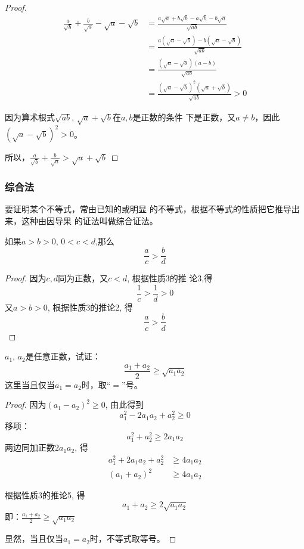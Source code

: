 \begin{proof}
\[\begin{split}
     \frac{a}{\sqrt{b}}+\frac{b}{\sqrt{a}}-\sqrt{a}-\sqrt{b}
    &=\frac{a\sqrt{a}+b\sqrt{b}-a\sqrt{b}-b\sqrt{a}}{\sqrt{ab}}\\
    &=\frac{a\left(\sqrt{a}-\sqrt{b}\right)-b\left(\sqrt{a}-\sqrt{b}\right)}{\sqrt{ab}}\\
    &=\frac{\left(\sqrt{a}-\sqrt{b}\right)(a-b)}{\sqrt{ab}}\\
    &=\frac{\left(\sqrt{a}-\sqrt{b}\right)^2\left(\sqrt{a}+\sqrt{b}\right)}{\sqrt{ab}}>0
\end{split}\]

因为算术根式$\sqrt{ab}$, $\sqrt{a}+\sqrt{b}$在$a,b$是正数的条件
下是正数，又$a\ne b$，因此$\left(\sqrt{a}-\sqrt{b}\right)^2>0$。

所以，$\frac{a}{\sqrt{b}}+\frac{b}{\sqrt{a}}>\sqrt{a}+\sqrt{b}$
\end{proof}

\subsubsection{综合法}
要证明某个不等式，常由已知的或明显
的不等式，根据不等式的性质把它推导出来，这种由因导果
的证法叫做综合证法。
\begin{example}
    如果$a>b>0$, $0<c<d$,那么
    \begin{equation}
        \frac{a}{c}>\frac{b}{d}
    \end{equation}
\end{example}

\begin{proof}
 因为$c,d$同为正数，又$c<d$, 根据性质3的推
论3,得\[\frac{1}{c}>\frac{1}{d}>0\]
又$a>b>0$,
根据性质3的推论2, 得   
\[\frac{a}{c}>\frac{b}{d}\]
\end{proof}
    
\begin{example}
    $a_1$, $a_2$是任意正数，试证：
\begin{equation}
    \frac{a_1+a_2}{2}\ge \sqrt{a_1a_2}
\end{equation}
这里当且仅当$a_1=a_2$时，取“$=$”号。
\end{example}

\begin{proof}
    因为$(a_1-a_2)^2\ge 0$, 由此得到
\[a_1^2-2a_1a_2+a_2^2\ge 0\]
移项：
\[a^2_1+a^2_2\ge 2a_1a_2\]
两边同加正数$2a_1a_2$, 得
\[\begin{split}
    a_1^2+2a_1a_2+a^2_2&\ge 4a_1a_2\\
(a_1+a_2)^2&\ge 4a_1a_2
\end{split}\]

根据性质3的推论5, 得
\[a_1+a_2\ge 2\sqrt{a_1a_2}\]
即：$\frac{a_1+a_2}{2}\ge \sqrt{a_1a_2}$

显然，当且仅当$a_1=a_2$时，不等式取等号。
\end{proof}


